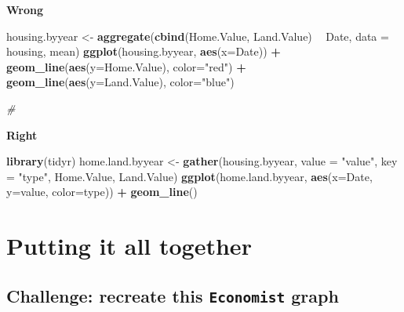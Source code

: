 \documentclass[]{book}
\newenvironment{Shaded}{\begin{snugshade}}{\end{snugshade}}
\newcommand{\KeywordTok}[1]{\textcolor[rgb]{0.13,0.29,0.53}{\textbf{#1}}}
\newcommand{\DataTypeTok}[1]{\textcolor[rgb]{0.13,0.29,0.53}{#1}}
\newcommand{\StringTok}[1]{\textcolor[rgb]{0.31,0.60,0.02}{#1}}
\newcommand{\CommentTok}[1]{\textcolor[rgb]{0.56,0.35,0.01}{\textit{#1}}}
\newcommand{\OperatorTok}[1]{\textcolor[rgb]{0.81,0.36,0.00}{\textbf{#1}}}
\newcommand{\NormalTok}[1]{#1}
\begin{document}
\textbf{Wrong}

\begin{Shaded}
\begin{Highlighting}[]
\NormalTok{housing.byyear <-}\StringTok{ }\KeywordTok{aggregate}\NormalTok{(}\KeywordTok{cbind}\NormalTok{(Home.Value, Land.Value) }\OperatorTok{~}\StringTok{ }\NormalTok{Date, }\DataTypeTok{data =}\NormalTok{ housing, mean)}
\KeywordTok{ggplot}\NormalTok{(housing.byyear,}
       \KeywordTok{aes}\NormalTok{(}\DataTypeTok{x=}\NormalTok{Date)) }\OperatorTok{+}
\StringTok{  }\KeywordTok{geom_line}\NormalTok{(}\KeywordTok{aes}\NormalTok{(}\DataTypeTok{y=}\NormalTok{Home.Value), }\DataTypeTok{color=}\StringTok{"red"}\NormalTok{) }\OperatorTok{+}
\StringTok{  }\KeywordTok{geom_line}\NormalTok{(}\KeywordTok{aes}\NormalTok{(}\DataTypeTok{y=}\NormalTok{Land.Value), }\DataTypeTok{color=}\StringTok{"blue"}\NormalTok{)}

\CommentTok{#}
\end{Highlighting}
\end{Shaded}

\textbf{Right}

\begin{Shaded}
\begin{Highlighting}[]
\KeywordTok{library}\NormalTok{(tidyr)}
\NormalTok{home.land.byyear <-}\StringTok{ }\KeywordTok{gather}\NormalTok{(housing.byyear,}
                           \DataTypeTok{value =} \StringTok{"value"}\NormalTok{,}
                           \DataTypeTok{key =} \StringTok{"type"}\NormalTok{,}
\NormalTok{                           Home.Value, Land.Value)}
\KeywordTok{ggplot}\NormalTok{(home.land.byyear,}
       \KeywordTok{aes}\NormalTok{(}\DataTypeTok{x=}\NormalTok{Date,}
           \DataTypeTok{y=}\NormalTok{value,}
           \DataTypeTok{color=}\NormalTok{type)) }\OperatorTok{+}
\StringTok{  }\KeywordTok{geom_line}\NormalTok{()}
\end{Highlighting}
\end{Shaded}

\section{Putting it all together}\label{putting-it-all-together}

\subsection{\texorpdfstring{Challenge: recreate this \texttt{Economist}
graph}{Challenge: recreate this Economist graph}}\label{challenge-recreate-this-economist-graph}
\end{document}
